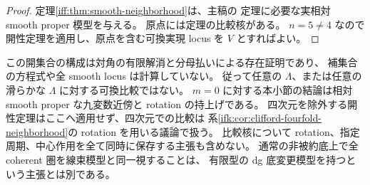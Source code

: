 \begin{proof}
定理\ref{iff:thm:smooth-neighborhood}は、主稿の
定理に必要な実相対 smooth proper 模型を与える。
原点には定理の比較核がある。
$n=5\ne4$ なので開性定理を適用し、原点を含む可換実現 locus を $V$ とすればよい。
\end{proof}

\begin{remark}[結論の範囲]
この開集合の構成は対角の有限解消と分母払いによる存在証明であり、
補集合の方程式や全 smooth locus は計算していない。
従って任意の $\Lambda$、または任意の滑らかな $\Lambda$ に対する可換比較ではない。
$m=0$ に対する本小節の結論は相対 smooth proper な九変数近傍と rotation の持上げである。
四次元を除外する開性定理はここへ適用せず、四次元での比較は
系\ref{ifk:cor:clifford-fourfold-neighborhood}の rotation を用いる議論で扱う。
比較核について rotation、指定周期、中心作用を全て同時に保存する主張も含めない。
通常の非被約底上で全 coherent 圏を線束模型と同一視することは、
有限型の dg 底変更模型を持つという主張とは別である。
\end{remark}
